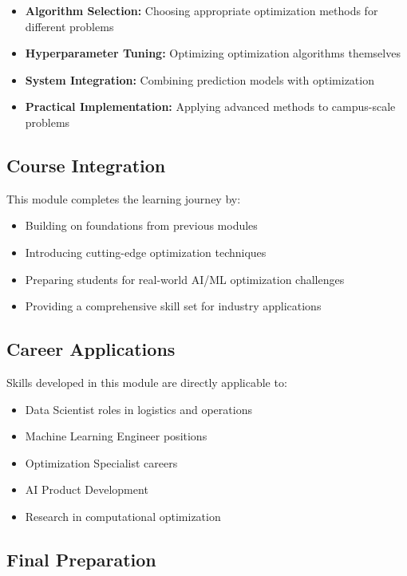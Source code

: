 \documentclass[
  letterpaper,
  DIV=11,
  numbers=noendperiod]{scrreprt}
\providecommand{\tightlist}{%
  \setlength{\itemsep}{0pt}\setlength{\parskip}{0pt}}
\begin{document}
\begin{itemize}
\tightlist
\item
  \textbf{Algorithm Selection:} Choosing appropriate optimization
  methods for different problems
\item
  \textbf{Hyperparameter Tuning:} Optimizing optimization algorithms
  themselves
\item
  \textbf{System Integration:} Combining prediction models with
  optimization
\item
  \textbf{Practical Implementation:} Applying advanced methods to
  campus-scale problems
\end{itemize}

\subsection{Course Integration}\label{course-integration}

This module completes the learning journey by:

\begin{itemize}
\tightlist
\item
  Building on foundations from previous modules
\item
  Introducing cutting-edge optimization techniques
\item
  Preparing students for real-world AI/ML optimization challenges
\item
  Providing a comprehensive skill set for industry applications
\end{itemize}

\subsection{Career Applications}\label{career-applications}

Skills developed in this module are directly applicable to:

\begin{itemize}
\tightlist
\item
  Data Scientist roles in logistics and operations
\item
  Machine Learning Engineer positions
\item
  Optimization Specialist careers
\item
  AI Product Development
\item
  Research in computational optimization
\end{itemize}

\subsection{Final Preparation}\label{final-preparation}
\end{document}
